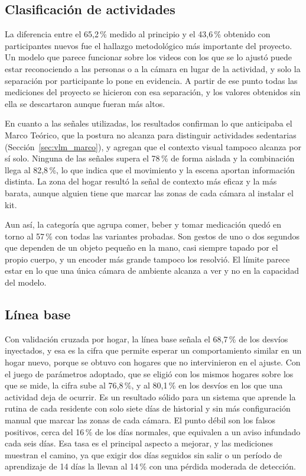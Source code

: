 \subsection{Clasificación de actividades}

La diferencia entre el 65,2\,\% medido al principio y el 43,6\,\% obtenido con participantes nuevos fue el hallazgo metodológico más importante del proyecto.
Un modelo que parece funcionar sobre los videos con los que se lo ajustó puede estar reconociendo a las personas o a la cámara en lugar de la actividad, y solo la separación por participante lo pone en evidencia.
A partir de ese punto todas las mediciones del proyecto se hicieron con esa separación, y los valores obtenidos sin ella se descartaron aunque fueran más altos.

En cuanto a las señales utilizadas, los resultados confirman lo que anticipaba el Marco Teórico, que la postura no alcanza para distinguir actividades sedentarias (Sección~\ref{sec:vlm_marco}), y agregan que el contexto visual tampoco alcanza por sí solo.
Ninguna de las señales supera el 78\,\% de forma aislada y la combinación llega al 82,8\,\%, lo que indica que el movimiento y la escena aportan información distinta.
La zona del hogar resultó la señal de contexto más eficaz y la más barata, aunque alguien tiene que marcar las zonas de cada cámara al instalar el kit.

Aun así, la categoría que agrupa comer, beber y tomar medicación quedó en torno al 57\,\% con todas las variantes probadas.
Son gestos de uno o dos segundos que dependen de un objeto pequeño en la mano, casi siempre tapado por el propio cuerpo, y un encoder más grande tampoco los resolvió.
El límite parece estar en lo que una única cámara de ambiente alcanza a ver y no en la capacidad del modelo.

\subsection{Línea base}

Con validación cruzada por hogar, la línea base señala el 68,7\,\% de los desvíos inyectados, y esa es la cifra que permite esperar un comportamiento similar en un hogar nuevo, porque se obtuvo con hogares que no intervinieron en el ajuste.
Con el juego de parámetros adoptado, que se eligió con los mismos hogares sobre los que se mide, la cifra sube al 76,8\,\%, y al 80,1\,\% en los desvíos en los que una actividad deja de ocurrir.
Es un resultado sólido para un sistema que aprende la rutina de cada residente con solo siete días de historial y sin más configuración manual que marcar las zonas de cada cámara.
El punto débil son los falsos positivos, cerca del 16\,\% de los días normales, que equivalen a un aviso infundado cada seis días.
Esa tasa es el principal aspecto a mejorar, y las mediciones muestran el camino, ya que exigir dos días seguidos sin salir o un período de aprendizaje de 14 días la llevan al 14\,\% con una pérdida moderada de detección.

